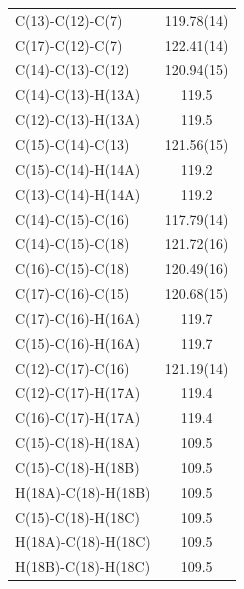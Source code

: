 \begin{center}
{\begin{supertabular}{p{1.5in}c}
C(13)-C(12)-C(7)&	119.78(14)\\
C(17)-C(12)-C(7)&	122.41(14) \\
C(14)-C(13)-C(12)&	120.94(15)\\
C(14)-C(13)-H(13A)&	119.5\\
C(12)-C(13)-H(13A)	&119.5\\
C(15)-C(14)-C(13)&	121.56(15)\\
C(15)-C(14)-H(14A)&	119.2\\
C(13)-C(14)-H(14A)	&119.2\\
C(14)-C(15)-C(16)&	117.79(14)\\
C(14)-C(15)-C(18)&	121.72(16)\\
C(16)-C(15)-C(18)&	120.49(16)\\
C(17)-C(16)-C(15)&	120.68(15)\\
C(17)-C(16)-H(16A)&	119.7\\
C(15)-C(16)-H(16A)&	119.7\\
C(12)-C(17)-C(16)&	121.19(14)\\
C(12)-C(17)-H(17A)&	119.4\\
C(16)-C(17)-H(17A)&	119.4\\
C(15)-C(18)-H(18A)&	109.5\\
C(15)-C(18)-H(18B)&	109.5\\
H(18A)-C(18)-H(18B)&	109.5 \\
C(15)-C(18)-H(18C)	&109.5 \\
H(18A)-C(18)-H(18C)&	109.5 \\
H(18B)-C(18)-H(18C)&	109.5\\
\end{supertabular}
}
\end{center}


